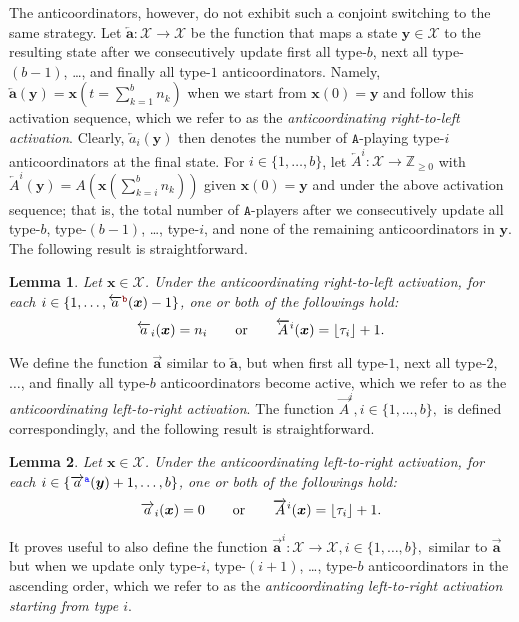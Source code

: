 \documentclass[10 pt,twocolumn,journal]{IEEEtran}
\DeclarePairedDelimiter{\floor}{\lfloor}{\rfloor}
\theoremstyle{plain}
\newtheorem{lemma}{Lemma}
\newcommand{\A}{\mathcal{A}}
\newcommand{\X}{\mathcal{X}}
\newcommand{\x}{\bm{x}}
\newcommand{\y}{\bm{y}}
\renewcommand{\a}{\bm{a}}
\newcommand{\n}{\tb{\mathtt{a}}}
\renewcommand{\o}{\tr{\mathtt{b}}}
\renewcommand{\A}{\mathtt{A}}
\newcommand{\tb}{\textcolor{blue}}
\newcommand{\tr}{\textcolor{Myred}}
\theoremstyle{definition}
\begin{document}
The anticoordinators, however, do not exhibit such a conjoint switching to the same strategy. 
Let $\overleftarrow{\a}: \X \to \X$ be the function that maps a state $\y\in\X$
to the resulting state after we consecutively update first all type-$b$, next all type-$(b-1)$, \ldots, and finally all type-$1$ anticoordinators.
Namely, $\overleftarrow{\a}(\y) = \x(t=\sum_{k = 1}^{b}n_k)$ when we start from $\x(0) = \y$ and follow this activation sequence, which we refer to as the \emph{anticoordinating right-to-left activation}.
Clearly, $\overleftarrow{a}_i(\y)$ then denotes the number of $\A$-playing type-$i$ anticoordinators at the final state.
For $i\in\{1,\ldots, b\}$, let $\overleftarrow{A}^{i}: \X\to\mathbb{Z}_{\geq0}$ with $\overleftarrow{A}^{i}(\y) = A(\x(\sum_{k = i}^{b}n_k))$ given $\x(0) = \y$ and under the above activation sequence; that is, the total number of $\A$-players after we consecutively update all type-$b$, type-$(b-1)$, \ldots, type-$i$, and none of the remaining anticoordinators in $\y$. 
The following result is straightforward.
\begin{lemma}   \label{lem01}
    Let $\x\in\X$.
    Under the anticoordinating right-to-left activation, 
    for each $i \in \{1,\ldots, \overleftarrow{a}^{\o}(\x)-1\}$, one or both of the followings hold:
    \begin{equation*}
        \overleftarrow{a}_i(\x) = n_i \qquad\text{or}\qquad
        \overleftarrow{A}^{i}(\x) = \floor{\tau_i}+1. 
    \end{equation*} 
\end{lemma}
We define the function $\overrightarrow{\a}$ similar to $\overleftarrow{\a}$, but when first all type-$1$, next all type-$2$, $\ldots$, and finally all type-$b$ anticoordinators become active, which we refer to as the \emph{anticoordinating left-to-right activation}. 
The function $\overrightarrow{A}^{i}, i\in\{1,\ldots, b\},$ is defined correspondingly, and the following result is straightforward. 
\begin{lemma}   \label{lem02}
    Let $\x\in\X$.
    Under the anticoordinating left-to-right activation, 
    for each $i \in \{\overrightarrow{a}^{\n}(\y)+1,\ldots, b\}$, one or both of the followings hold:
    \begin{equation*}
        \overrightarrow{a}_i(\x) = 0 \qquad\text{or}\qquad
        \overrightarrow{A}^{i}(\x) = \floor{\tau_i}+1.
    \end{equation*}
\end{lemma}
It proves useful to also define the function $\overrightarrow{\a}^{i}: \X\to\X, i\in\{1,\ldots,b\},$ similar to $\overrightarrow{\a}$ but when we update only type-$i$, type-$(i+1)$, \ldots, type-$b$ anticoordinators in the ascending order, which we refer to as the \emph{anticoordinating left-to-right activation starting from type $i$}. 
\end{document}

